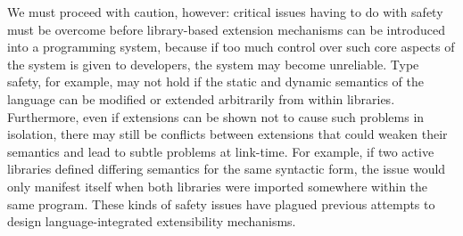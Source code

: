 We must proceed with caution, however: critical issues having to do with {safety} must be overcome before library-based extension mechanisms can be introduced into a programming system, because if too much control over such core aspects of the system is given  to developers, the system may become unreliable. 
Type safety, for example, may not hold if the static and dynamic semantics of the language can be modified or extended arbitrarily from within libraries. Furthermore, even if extensions can be shown not to cause such problems in isolation, there may still be conflicts between extensions that could weaken their semantics and lead to subtle problems at link-time. For example, if two active libraries defined differing semantics for the same syntactic form, the issue would only manifest itself when both libraries were imported somewhere within the same program. These kinds of safety issues have plagued previous attempts to design language-integrated extensibility mechanisms.%





